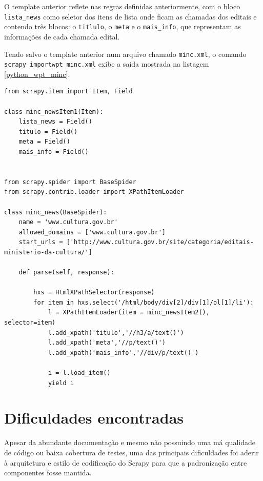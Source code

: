 O template anterior reflete nas regras definidas anteriormente, com o bloco \texttt{lista\_news} como seletor dos itens de lista onde ficam as chamadas dos editais e contendo três blocos: o \texttt{titlulo}, o \texttt{meta} e o \texttt{mais\_info}, que representam as informações de cada chamada edital.

Tendo salvo o template anterior num arquivo chamado \texttt{minc.xml}, o comando \texttt{scrapy importwpt minc.xml} exibe a saída mostrada na listagem \ref{python_wpt_minc}.

\pagebreak
{}
\begin{lstlisting}[label=python_wpt_minc]
from scrapy.item import Item, Field

class minc_newsItem1(Item):
    lista_news = Field()
    titulo = Field()
    meta = Field()
    mais_info = Field()


from scrapy.spider import BaseSpider
from scrapy.contrib.loader import XPathItemLoader

class minc_news(BaseSpider):
    name = 'www.cultura.gov.br'
    allowed_domains = ['www.cultura.gov.br']
    start_urls = ['http://www.cultura.gov.br/site/categoria/editais-ministerio-da-cultura/']

    def parse(self, response):
        
        hxs = HtmlXPathSelector(response)
        for item in hxs.select('/html/body/div[2]/div[1]/ol[1]/li'):
            l = XPathItemLoader(item = minc_newsItem2(), selector=item)
            l.add_xpath('titulo','//h3/a/text()')
            l.add_xpath('meta','//p/text()')
            l.add_xpath('mais_info','//div/p/text()')

            i = l.load_item()
            yield i

\end{lstlisting}


\pagebreak
\section{Dificuldades encontradas}

Apesar da abundante documentação e mesmo não possuindo uma má qualidade de código ou baixa cobertura de testes, uma das principais dificuldades foi aderir à arquitetura e estilo de codificação do Scrapy para que a padronização entre componentes fosse mantida.

